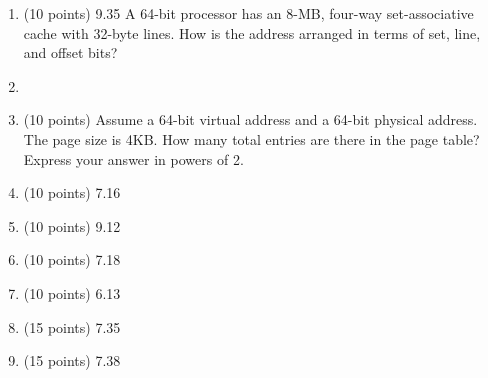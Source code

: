 \documentclass[letterpaper,10pt,onecolumn,titlepage]{article}
\begin{document}
\begin{enumerate}
\item (10 points) 9.35
	A 64-bit processor has an 8-MB, four-way set-associative cache with 32-byte lines.
	How is the address arranged in terms of set, line, and offset bits?
\item[\textbullet] 

\item (10 points) Assume a 64-bit virtual address and a 64-bit physical address. The page
  size is 4KB. How many total entries are there in the page table? Express your answer in
  powers of 2.

\item (10 points) 7.16 

\item (10 points) 9.12

\item (10 points) 7.18

\item (10 points) 6.13

\item (15 points) 7.35

\item (15 points) 7.38

\end{enumerate}
\end{document}
